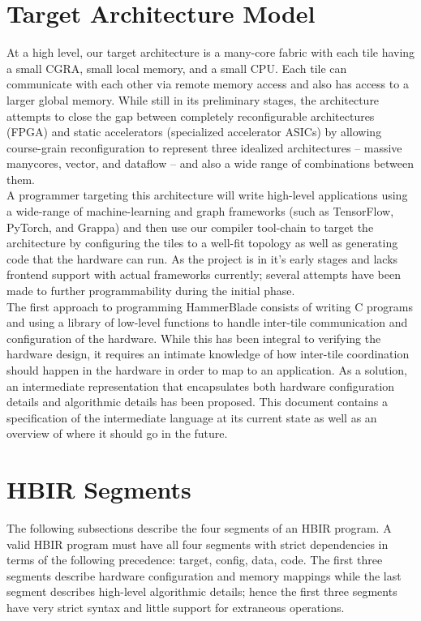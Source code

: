\documentclass{article}
\begin{document}
\section{Target Architecture Model}
At a high level, our target architecture is a many-core fabric with each tile having a small CGRA, small local memory, and a small CPU. Each tile can communicate with each other via remote memory access and also has access to a larger global memory. While still in its preliminary stages, the architecture attempts to close the gap between completely reconfigurable architectures (FPGA) and static accelerators (specialized accelerator ASICs) by allowing course-grain reconfiguration to represent three idealized architectures -- massive manycores, vector, and dataflow -- and also a wide range of combinations between them. \\

A programmer targeting this architecture will write high-level applications using a wide-range of machine-learning and graph frameworks (such as TensorFlow, PyTorch, and Grappa) and then use our compiler tool-chain to target the architecture by configuring the tiles to a well-fit topology as well as generating code that the hardware can run. As the project is in it's early stages and lacks frontend support with actual frameworks currently; several attempts have been made to further programmability during the initial phase. \\

The first approach to programming HammerBlade consists of writing C programs and using a library of low-level functions to handle inter-tile communication and configuration of the hardware. While this has been integral to verifying the hardware design, it requires an intimate knowledge of how inter-tile coordination should happen in the hardware in order to map to an application. As a solution, an intermediate representation that encapsulates both hardware configuration details and algorithmic details has been proposed. This document contains a specification of the intermediate language at its current state as well as an overview of where it should go in the future. \\

\section{HBIR Segments}
\noindent
The following subsections describe the four segments of an HBIR program. A valid HBIR program must have all four segments with strict dependencies in terms of the following precedence: target, config, data, code. The first three segments describe hardware configuration and memory mappings while the last segment describes high-level algorithmic details; hence the first three segments have very strict syntax and little support for extraneous operations.
\end{document}
